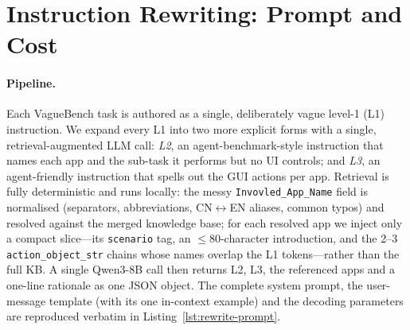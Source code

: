 %
%

\section{Instruction Rewriting: Prompt and Cost}
\label{app:rewrite}

\paragraph{Pipeline.}
Each VagueBench task is authored as a single, deliberately vague level-1 (L1)
instruction. We expand every L1 into two more explicit forms with a single,
retrieval-augmented LLM call: \emph{L2}, an agent-benchmark-style instruction
that names each app and the sub-task it performs but no UI controls; and
\emph{L3}, an agent-friendly instruction that spells out the GUI actions per
app. Retrieval is fully deterministic and runs locally: the messy
\texttt{Invovled\_App\_Name} field is normalised (separators, abbreviations,
CN$\leftrightarrow$EN aliases, common typos) and resolved against the merged
knowledge base; for each resolved app we inject only a compact slice---its
\texttt{scenario} tag, an $\le\!80$-character introduction, and the 2--3
\texttt{action\_object\_str} chains whose names overlap the L1 tokens---rather
than the full KB. A single Qwen3-8B call then returns L2, L3, the referenced
apps and a one-line rationale as one JSON object. The complete system prompt,
the user-message template (with its one in-context example) and the decoding
parameters are reproduced verbatim in Listing~\ref{lst:rewrite-prompt}.


